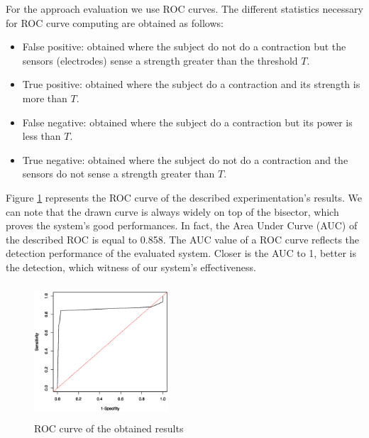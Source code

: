 \documentclass[conference]{IEEEtran}
\begin{document}
For the approach evaluation we use ROC curves. The different statistics necessary for ROC curve computing are obtained as follows:
\begin{itemize}
\item False positive: obtained where the subject do not do a contraction but the sensors (electrodes) sense a strength greater than the threshold $T$.
\item True positive: obtained where the subject do a contraction and its strength is more than $T$.
\item False negative: obtained where the subject do a contraction but its power is less than $T$.
\item True negative: obtained where the subject do not do a contraction and the sensors do not sense a strength greater than $T$.
\end{itemize}

Figure \ref{fig:rocGraph} represents the ROC curve of the described experimentation's results. We can note that the drawn curve is always widely on top of the bisector, which proves the system's good performances. In fact, the Area Under Curve (AUC) of the described ROC is equal to 0.858. The AUC value of a ROC curve reflects the detection performance of the evaluated system. Closer is the AUC to 1, better is the detection, which witness of our system's effectiveness.

\begin{figure}[t]
\begin{center}
    \includegraphics[width=5cm, height=5cm]{Images/ROC.eps}
    \caption{ROC curve of the obtained results}
    \label{fig:rocGraph}
\end{center}
\end{figure}
\end{document}
